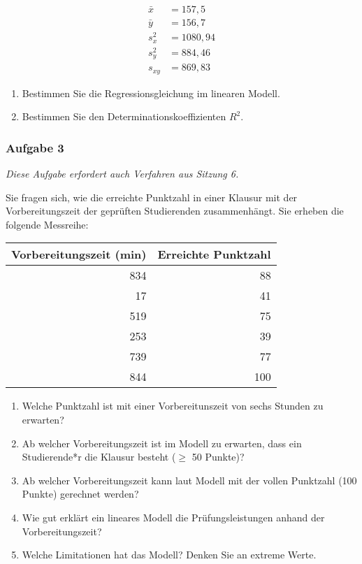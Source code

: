\documentclass[
  ngerman,
]{article}
\begin{document}
\[\begin{aligned}
\bar{x}&=157,5\\
\bar{y}&=156,7\\
s^2_{x}&=1080,94\\
s^2_{y}&=884,46\\
s_{xy}&=869,83
\end{aligned}\]

\begin{enumerate}
\def\labelenumi{\alph{enumi})}
\item
  Bestimmen Sie die Regressionsgleichung im linearen Modell.
\item
  Bestimmen Sie den Determinationskoeffizienten \(R^2\).
\end{enumerate}

\hypertarget{aufgabe-3-5}{%
\subsubsection{Aufgabe 3}\label{aufgabe-3-5}}

\emph{Diese Aufgabe erfordert auch Verfahren aus Sitzung 6.}

Sie fragen sich, wie die erreichte Punktzahl in einer Klausur mit der Vorbereitungszeit der geprüften Studierenden zusammenhängt. Sie erheben die folgende Messreihe:

\begin{table}
\centering
\begin{tabular}{rr}
\toprule
Vorbereitungszeit (min) & Erreichte Punktzahl\\
\midrule
834 & 88\\
17 & 41\\
519 & 75\\
253 & 39\\
739 & 77\\
844 & 100\\
\bottomrule
\end{tabular}
\end{table}

\begin{enumerate}
\def\labelenumi{\alph{enumi})}
\item
  Welche Punktzahl ist mit einer Vorbereitunszeit von sechs Stunden zu erwarten?
\item
  Ab welcher Vorbereitungszeit ist im Modell zu erwarten, dass ein Studierende*r die Klausur besteht (\(\geq\) 50 Punkte)?
\item
  Ab welcher Vorbereitungszeit kann laut Modell mit der vollen Punktzahl (100 Punkte) gerechnet werden?
\item
  Wie gut erklärt ein lineares Modell die Prüfungsleistungen anhand der Vorbereitungszeit?
\item
  Welche Limitationen hat das Modell? Denken Sie an extreme Werte.
\end{enumerate}
\end{document}

